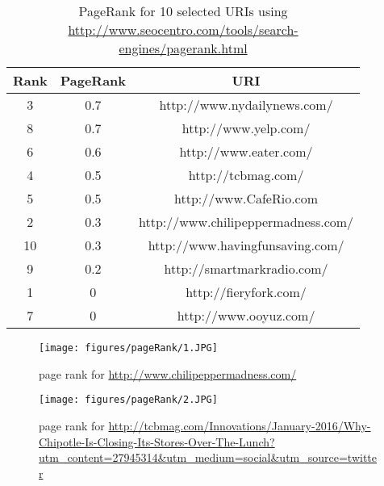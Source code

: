 \begin{table}

\caption{PageRank for 10 selected URIs using {\url{http://www.seocentro.com/tools/search-engines/pagerank.html}}}
\label{Table:q3table1}
\begin{center}
\begin{tabular}{ c | c | c }
\hline
Rank & PageRank & URI \\ \hline

3 & 0.7 & http://www.nydailynews.com/ \\ \hline
8 & 0.7 & http://www.yelp.com/ \\ \hline
6 & 0.6 & http://www.eater.com/ \\ \hline
4 & 0.5 & http://tcbmag.com/ \\ \hline
5 & 0.5 & http://www.CafeRio.com \\ \hline
2 & 0.3 & http://www.chilipeppermadness.com/ \\ \hline
10 & 0.3 & http://www.havingfunsaving.com/ \\ \hline
9 & 0.2 & http://smartmarkradio.com/ \\ \hline
1 & 0 & http://fieryfork.com/ \\ \hline
7 & 0 & http://www.ooyuz.com/ \\ \hline

\hline

\end{tabular}
\end{center}
\end{table} 

\newpage
\begin{figure}[h!]
\begin{center}
\hspace*{-1.5in}
\texttt{[image: figures/pageRank/1.JPG]}
\caption{page rank for {\url{http://www.chilipeppermadness.com/}}}
\label{fig:q3fig1}
\end{center}
\end{figure}

\begin{figure}[h!]
\begin{center}
\hspace*{-1.5in}
\texttt{[image: figures/pageRank/2.JPG]}
\caption{page rank for {\url{http://tcbmag.com/Innovations/January-2016/Why-Chipotle-Is-Closing-Its-Stores-Over-The-Lunch?utm_content=27945314&utm_medium=social&utm_source=twitter}}}
\label{fig:q3fig2}
\end{center}
\end{figure}

